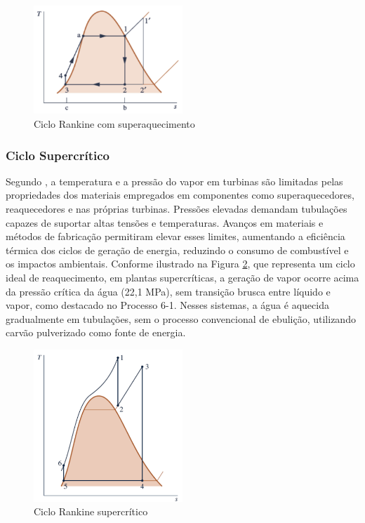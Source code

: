 \documentclass[
	article,			%
	11pt,				%
	oneside,			%
	a4paper,			%
	english,			%
	brazil,				%
	sumario=tradicional
	]{abntex2}
\begin{document}
\begin{figure}[h]
	\centering
	\includegraphics[width=0.5\textwidth]{./images/superaquecido.png}
	\caption{Ciclo Rankine com superaquecimento}
	\label{fig:superaquecido}
\end{figure}


\subsubsection{Ciclo Supercrítico}

Segundo , a temperatura e a pressão do vapor em turbinas são limitadas pelas propriedades dos materiais empregados em componentes como superaquecedores, reaquecedores e nas próprias turbinas. Pressões elevadas demandam tubulações capazes de suportar altas tensões e temperaturas. Avanços em materiais e métodos de fabricação permitiram elevar esses limites, aumentando a eficiência térmica dos ciclos de geração de energia, reduzindo o consumo de combustível e os impactos ambientais. Conforme ilustrado na Figura \ref{fig:supercritico}, que representa um ciclo ideal de reaquecimento, em plantas supercríticas, a geração de vapor ocorre acima da pressão crítica da água (22,1 MPa), sem transição brusca entre líquido e vapor, como destacado no Processo 6-1. Nesses sistemas, a água é aquecida gradualmente em tubulações, sem o processo convencional de ebulição, utilizando carvão pulverizado como fonte de energia.

\begin{figure}[h]
	\centering
	\includegraphics[width=0.5\textwidth]{./images/supercritico.png}
	\caption{Ciclo Rankine supercrítico}
	\label{fig:supercritico}
\end{figure}
\end{document}

